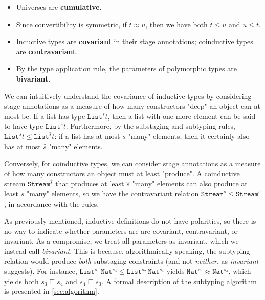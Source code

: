 \documentclass[nonacm,screen,10pt]{acmart}
\begin{document}
\begin{itemize}
    \item Universes are \textbf{cumulative}. 
    \item Since convertibility is symmetric, if $t \approx u$, then we have both $t \leq u$ and $u \leq t$. 
    \item Inductive types are \textbf{covariant} in their stage annotations; coinductive types are \textbf{contravariant}.  
    \item By the type application rule, the parameters of polymorphic types are \textbf{bivariant}. 
\end{itemize}

We can intuitively understand the covariance of inductive types by considering stage annotations as a measure of how many constructors "deep" an object can at most be. If a list has type $\texttt{List}^s t$, then a list with one more element can be said to have type $\texttt{List}^{\hat{s}} t$. Furthermore, by the substaging and subtyping rules, $\texttt{List}^s t \leq \texttt{List}^{\hat{s}} t$: if a list has at most $s$ "many" elements, then it certainly also has at most $\hat{s}$ "many" elements.

Conversely, for coinductive types, we can consider stage annotations as a measure of how many constructors an object must at least "produce". A coinductive stream $\texttt{Stream}^{\hat{s}}$ that produces at least $\hat{s}$ "many" elements can also produce at least $s$ "many" elements, so we have the contravariant relation $\texttt{Stream}^{\hat{s}} \leq \texttt{Stream}^s$, in accordance with the rules.

As previously mentioned, inductive definitions do not have polarities, so there is no way to indicate whether parameters are are covariant, contravariant, or invariant. As a compromise, we treat all parameters as invariant, which we instead call \textit{bivariant}. This is because, algorithmically speaking, the subtyping relation would produce \textit{both} substaging constraints (and not \textit{neither}, as \textit{invariant} suggests). For instance, $\texttt{List}^{s_1}\ \texttt{Nat}^{s_3} \leq \texttt{List}^{s_2}\ \texttt{Nat}^{s_4}$ yields $\texttt{Nat}^{s_3} \approx \texttt{Nat}^{s_4}$, which yields both $s_3 \sqsubseteq s_4$ and $s_4 \sqsubseteq s_3$. A formal description of the subtyping algorithm is presented in \autoref{sec:algorithm}.


\end{document}
